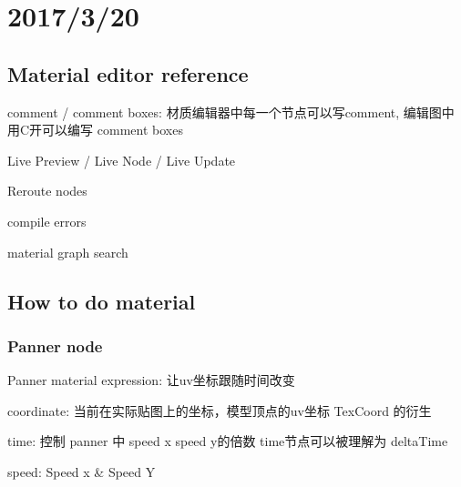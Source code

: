 \documentclass[12pt, a4paper]{article}
\begin{document}
    \section*{2017/3/20} 

    \subsection*{Material editor reference}
        comment / comment boxes: 材质编辑器中每一个节点可以写comment, 编辑图中用C开可以编写 comment boxes 

        Live Preview / Live Node / Live Update 

        Reroute nodes 

        compile errors

        material graph search 


    \subsection*{How to do material}

    \subsubsection*{Panner node}
        Panner material expression: 让uv坐标跟随时间改变

        coordinate: 当前在实际贴图上的坐标，模型顶点的uv坐标 TexCoord 的衍生

        time: 控制 panner 中 speed x speed y的倍数 time节点可以被理解为 deltaTime

        speed: Speed x \& Speed Y
\end{document}
